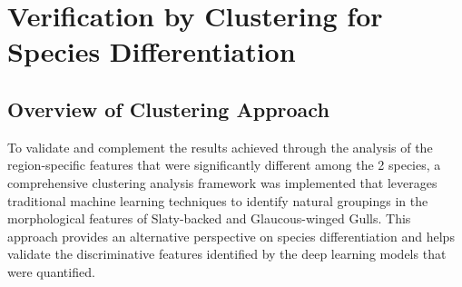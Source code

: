 \documentclass[a4paper,12pt]{report}
\begin{document}
    
    
    
    

\section{Verification by Clustering for Species Differentiation}

\subsection{Overview of Clustering Approach}

To validate and complement the results achieved through the analysis of the region-specific features that were significantly different among the 2 species, a comprehensive clustering analysis framework was implemented that leverages traditional machine learning techniques to identify natural groupings in the morphological features of Slaty-backed and Glaucous-winged Gulls. This approach provides an alternative perspective on species differentiation and helps validate the discriminative features identified by the deep learning models that were quantified.
\end{document}
